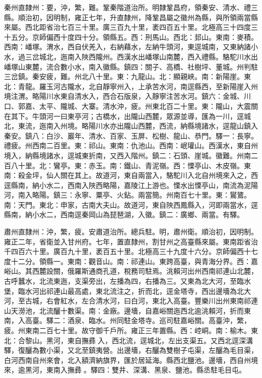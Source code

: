 \begin{pinyinscope}
秦州直隸州：要，沖，繁，難。鞏秦階道治所。明隸鞏昌府，領秦安、清水、禮三縣。順治初，因明制，雍正七年，升直隸州，降鞏昌屬之徽州為縣，與所領兩當縣來屬。西北距省治七百三十里。廣三百九十里，袤四百五十里。北極高三十四度三十五分。京師偏西十度四十分。領縣五。西：刑馬山。西北：邽山。東南：麥積。西南：嶓塚。渭水，西自伏羌入，右納藉水，左納牛頭河，東逕城南，又東納諸小水，過三岔城北，迤南入陜西隴州。西漢水出嶓塚山南麓，西入禮縣。駱駝川水出嶓塚山東麓，流合數小水，南入徽縣。鎮四：關子、高橋、社樹坪、董城。州判駐三岔鎮。秦安疲，難。州北八十里。東：九龍山。北：顯親峽。南：新陽崖。東北：青龍。羅玉河古隴水，北自靜寧州入，上承苦水河，南逕縣西，至新陽崖入州境注渭。略陽川水東自清水入，西合石版泉，入靜寧注苦水河。鎮六：金城、川口、郭嘉、太平、隴城、大寨。清水沖，疲。州東北百二十里。東：隴山，大震關在其下。牛頭河一曰東亭河；古橋水，出隴山西麓，眾源並導，匯為一川，逕城北，東流，迤南入州境。略陽川水亦出隴山西麓，西流，納縣境諸水，逕龍山鎮入秦安。鎮八：白沙、巖年、清水、百家、玉屏、松樹、龍山、恭門。驛一：長寧。禮疲。州西南二百里。東：祁山。東南：仇池山。西南：岷瓘山。西漢水，東自州境入，納縣境諸水，逕城東折南，又西入階州。鎮二：石頭、崖城。徽難。州南二百八十里。北：鸞亭。東：赤玉。南：鐵山、青泥嶺。西：慄亭山、木皮嶺。東南：殺金坪，仙人關在其上。故道河，東自兩當入，駱駝川入北自州境來入之，西逕縣南，納小水二，西南入陜西略陽，嘉陵江上游也。慄水出慄亭山，南流為泥陽河，南入略陽。鎮三：永寧、粟亭、火鉆。兩當簡。州南百七十里。東：鸑鷟。南：天門。東北：申家，古南大夫山。故道河，東自陜西鳳縣入，河即兩當水，逕縣南，納小水二，西南逕秦岡山為琵琶湖，入徽。鎮二：廣鄉、兩當。有驛。

肅州直隸州：沖，繁，疲。安肅道治所。總兵駐。明，肅州衛。順治初，因明制。雍正二年，省衛並入甘州府。七年，置直隸州，割甘州之高臺縣來屬。東南距省治千四百六十里。廣百九十里，袤百五十里。北極高三十九度十六分。京師偏西十七度十二分。領縣一。東南：觀音山。南：祁連山。東跨高臺，與青海分界。西：嘉峪山。其西麓設關，俄羅斯通商孔道，稅務司駐焉。洮賴河出州西南祁連山北麓，古呼蠶水，北流東迤，支渠旁出，左播為四，右播為三。又東為北大河，至臨水堡，臨水河出祁連山最高處，東北流注之，折而北，逕金塔寺，西出邊墻為北大河，至古城，右會紅水，左合清水河，曰白河，東北入高臺。豐樂川出州東南祁連山天澇池，北流釃十數渠。南：金廠。邊墻，自嘉峪關迤西北逾洮賴河，折而東南，入高臺。驛二：酒泉、臨水。州同駐金塔寺。巡司駐嘉峪關。高臺沖，繁，疲。州東南二百七十里。故守御千戶所。雍正三年置縣。西：崆峒。南：榆木。東北：合黎山。黑河，東自撫彞入，西北流，逕城北，左出支渠五。又西北逕深溝驛，復釃為數小渠，又北至鎮夷營。出邊墻，右釃為雙樹子屯渠，左釃為毛目渠，白河西南自州來會，北入額濟納旗界，匯於居延海。縣西北鹽池。邊墻，西自州境來，逾黑河，東南入撫彞。驛四：雙井、深溝、黑泉、鹽池。縣丞駐毛目屯。


\end{pinyinscope}
